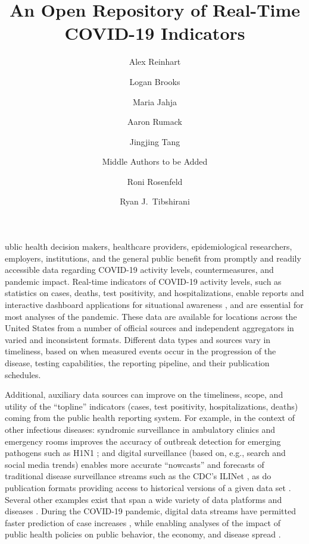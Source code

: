 \documentclass[9pt,twocolumn,twoside,lineno]{pnas-new}
\title{An Open Repository of Real-Time COVID-19 Indicators}
\author[a,1]{Alex Reinhart}
\author[b,2]{Logan Brooks}
\author[a,b,2]{Maria Jahja}
\author[b,2]{Aaron Rumack}
\author[c,2]{Jingjing Tang}
\author[d]{Middle Authors to be Added}
\author[b]{Roni Rosenfeld}
\author[a,b]{Ryan J.\ Tibshirani}
\affil[a]{Department of Statistics \& Data Science, Carnegie Mellon University}
\affil[b]{Machine Learning Department, Carnegie Mellon University}
\affil[c]{Computational Biology Department, Carnegie Mellon University}
\affil[d]{Remaining affiliations to be added}
\begin{document}
\maketitle
\thispagestyle{firststyle}

ublic health decision makers, healthcare providers, epidemiological 
researchers, employers, institutions, and the general public benefit from
promptly and readily accessible data regarding COVID-19 activity levels,
countermeasures, and pandemic impact.  Real-time indicators of COVID-19 
activity levels, such as statistics on cases, deaths, test positivity, and
hospitalizations, enable reports and interactive dashboard applications for
situational awareness \cite{Dong:2020, NYTimes, USAFacts}, and are essential for
most analyses of the pandemic.  These data are available for locations across
the United States from a number of official sources and independent aggregators
in varied and inconsistent formats.  Different data types and sources vary in
timeliness, based on when measured events occur in the progression of the
disease, testing capabilities, the reporting pipeline, and their publication
schedules.

Additional, auxiliary data sources can improve on the timeliness, scope, and
utility of the ``topline'' indicators (cases, test positivity, hospitalizations,
deaths) coming from the public health reporting system. For example, in the
context of other infectious diseases: syndromic surveillance in ambulatory
clinics and emergency rooms improves the accuracy of outbreak detection for
emerging pathogens such as H1N1 \cite{Kass-Hout:2012}; and digital surveillance
(based on, e.g., search and social media trends) enables more accurate
``nowcasts'' and forecasts of traditional disease surveillance streams such as
the CDC's ILINet \cite{Santillana:2015, Farrow:2016}, as do publication formats
providing access to historical versions of a given data set \cite{Brooks:2018, 
  Brooks:2020}. Several other examples exist that span a wide variety of data  
platforms and diseases \cite{Browstein:2009, Kass-Hout:2011, Salathe:2012,
  Kass-Hout:2013}. During the COVID-19 pandemic, digital data streams have
permitted faster prediction of case increases \cite{Ahmad:2020, Kogan:2021},
while enabling analyses of the impact of public health policies on public
behavior, the economy, and disease spread \cite{Bonaccorsi:2020, Nouvellet:2021,
  Adjodah:2021, Jewell:2021}.
\end{document}

